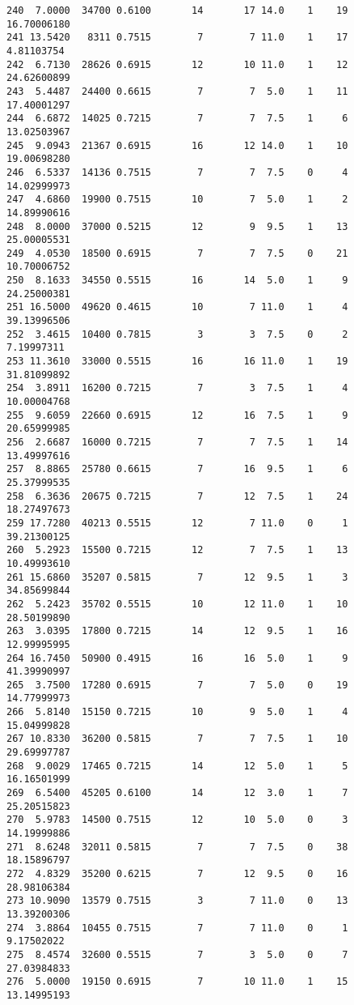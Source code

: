 \documentclass[
  letterpaper,
  DIV=11,
  numbers=noendperiod]{scrreprt}
\begin{document}
\begin{verbatim}
240  7.0000  34700 0.6100       14       17 14.0    1    19 16.70006180
241 13.5420   8311 0.7515        7        7 11.0    1    17  4.81103754
242  6.7130  28626 0.6915       12       10 11.0    1    12 24.62600899
243  5.4487  24400 0.6615        7        7  5.0    1    11 17.40001297
244  6.6872  14025 0.7215        7        7  7.5    1     6 13.02503967
245  9.0943  21367 0.6915       16       12 14.0    1    10 19.00698280
246  6.5337  14136 0.7515        7        7  7.5    0     4 14.02999973
247  4.6860  19900 0.7515       10        7  5.0    1     2 14.89990616
248  8.0000  37000 0.5215       12        9  9.5    1    13 25.00005531
249  4.0530  18500 0.6915        7        7  7.5    0    21 10.70006752
250  8.1633  34550 0.5515       16       14  5.0    1     9 24.25000381
251 16.5000  49620 0.4615       10        7 11.0    1     4 39.13996506
252  3.4615  10400 0.7815        3        3  7.5    0     2  7.19997311
253 11.3610  33000 0.5515       16       16 11.0    1    19 31.81099892
254  3.8911  16200 0.7215        7        3  7.5    1     4 10.00004768
255  9.6059  22660 0.6915       12       16  7.5    1     9 20.65999985
256  2.6687  16000 0.7215        7        7  7.5    1    14 13.49997616
257  8.8865  25780 0.6615        7       16  9.5    1     6 25.37999535
258  6.3636  20675 0.7215        7       12  7.5    1    24 18.27497673
259 17.7280  40213 0.5515       12        7 11.0    0     1 39.21300125
260  5.2923  15500 0.7215       12        7  7.5    1    13 10.49993610
261 15.6860  35207 0.5815        7       12  9.5    1     3 34.85699844
262  5.2423  35702 0.5515       10       12 11.0    1    10 28.50199890
263  3.0395  17800 0.7215       14       12  9.5    1    16 12.99995995
264 16.7450  50900 0.4915       16       16  5.0    1     9 41.39990997
265  3.7500  17280 0.6915        7        7  5.0    0    19 14.77999973
266  5.8140  15150 0.7215       10        9  5.0    1     4 15.04999828
267 10.8330  36200 0.5815        7        7  7.5    1    10 29.69997787
268  9.0029  17465 0.7215       14       12  5.0    1     5 16.16501999
269  6.5400  45205 0.6100       14       12  3.0    1     7 25.20515823
270  5.9783  14500 0.7515       12       10  5.0    0     3 14.19999886
271  8.6248  32011 0.5815        7        7  7.5    0    38 18.15896797
272  4.8329  35200 0.6215        7       12  9.5    0    16 28.98106384
273 10.9090  13579 0.7515        3        7 11.0    0    13 13.39200306
274  3.8864  10455 0.7515        7        7 11.0    0     1  9.17502022
275  8.4574  32600 0.5515        7        3  5.0    0     7 27.03984833
276  5.0000  19150 0.6915        7       10 11.0    1    15 13.14995193

\end{verbatim}
\end{document}

